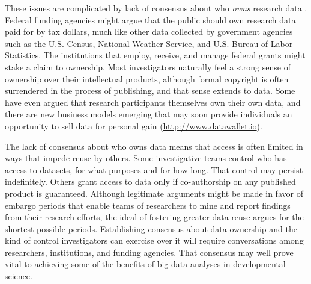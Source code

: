 \documentclass[letterpaper,man,apacite,natbib]{apa6}
\begin{document}
These issues are complicated by lack of consensus about who \emph{owns} research data \cite{who_owns_research_data}.
Federal funding agencies might argue that the public should own research data paid for by tax dollars, much like other data collected by government agencies such as the U.S. Census, National Weather Service, and U.S. Bureau of Labor Statistics.
The institutions that employ, receive, and manage federal grants might stake a claim to ownership.
Most investigators naturally feel a strong sense of ownership over their intellectual products, although formal copyright is often surrendered in the process of publishing, and that sense extends to data.
Some have even argued that research participants themselves own their own data, and there are new business models emerging that may soon provide individuals an opportunity to sell data for personal gain (\url{http://www.datawallet.io}).

The lack of consensus about who owns data means that access is often limited in ways that impede reuse by others.
Some investigative teams control who has access to datasets, for what purposes and for how long.
That control may persist indefinitely.
Others grant access to data only if co-authorship on any published product is guaranteed.
Although legitimate arguments might be made in favor of embargo periods that enable teams of researchers to mine and report findings from their research efforts, the ideal of fostering greater data reuse argues for the shortest possible periods.
Establishing consensus about data ownership and the kind of control investigators can exercise over it will require conversations among researchers, institutions, and funding agencies.
That consensus may well prove vital to achieving some of the benefits of big data analyses in developmental science. 
\end{document}
